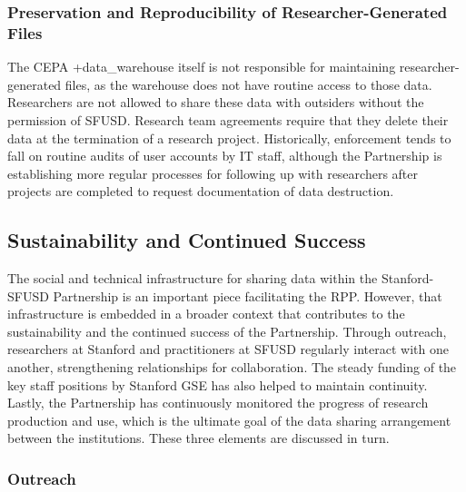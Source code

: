 \documentclass[
]{WileySix}
\begin{document}
\hypertarget{preservation-and-reproducibility-of-researcher-generated-files-3}{%
\subsubsection{Preservation and Reproducibility of Researcher-Generated Files}\label{preservation-and-reproducibility-of-researcher-generated-files-3}}

The CEPA +data\_warehouse\textbar{} itself is not responsible for maintaining researcher-generated files, as the warehouse does not have routine access to those data. Researchers are not allowed to share these data with outsiders without the permission of SFUSD. Research team agreements require that they delete their data at the termination of a research project. Historically, enforcement tends to fall on routine audits of user accounts by IT staff, although the Partnership is establishing more regular processes for following up with researchers after projects are completed to request documentation of data destruction.

\hypertarget{sustainability-and-continued-success-5}{%
\subsection{Sustainability and Continued Success}\label{sustainability-and-continued-success-5}}

The social and technical infrastructure for sharing data within the Stanford-SFUSD Partnership is an important piece facilitating the RPP. However, that infrastructure is embedded in a broader context that contributes to the sustainability and the continued success of the Partnership. Through outreach, researchers at Stanford and practitioners at SFUSD regularly interact with one another, strengthening relationships for collaboration. The steady funding of the key staff positions by Stanford GSE has also helped to maintain continuity. Lastly, the Partnership has continuously monitored the progress of research production and use, which is the ultimate goal of the data sharing arrangement between the institutions. These three elements are discussed in turn.

\hypertarget{outreach-4}{%
\subsubsection{Outreach}\label{outreach-4}}
\end{document}
